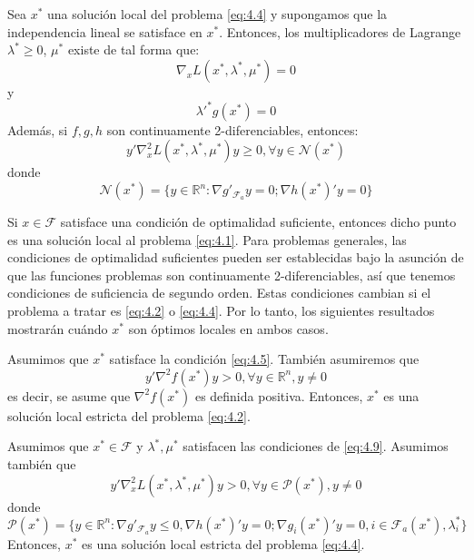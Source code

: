 \begin{proposicion}
Sea $x^*$ una solución local del problema \ref{eq:4.4} y supongamos que la independencia lineal se satisface en $x^*$. 
Entonces, los multiplicadores de Lagrange $\lambda^*\geq 0$, $\mu^*$ existe de tal forma que:
\begin{equation}
\nabla_xL(x^*,\lambda^*,\mu^*) = 0
\label{eq:4.9}
\end{equation}
y
\begin{equation*}
\lambda'^*g(x^*) = 0
\end{equation*}
Además, si $f,g,h$ son continuamente 2-diferenciables, entonces:
\begin{equation*}
y'\nabla_x^2L(x^*,\lambda^*,\mu^*)y \geq 0, \forall y\in\mathcal{N}(x^*)
\end{equation*}
donde
\begin{equation*}
\mathcal{N}(x^*) = \{y\in\mathbb{R}^n : \nabla g'_{\mathcal{F}_a}y=0; \nabla h(x^*)'y = 0\}
\end{equation*}
\end{proposicion}

Si $x\in\mathcal{F}$ satisface una condición de optimalidad suficiente, entonces dicho punto es una solución local al problema \ref{eq:4.1}. 
Para problemas generales, las condiciones de optimalidad suficientes pueden ser establecidas bajo la asunción de que las funciones problemas son continuamente 2-diferenciables, así que tenemos condiciones de suficiencia de segundo orden. 
Estas condiciones cambian si el problema a tratar es \ref{eq:4.2} o \ref{eq:4.4}. 
Por lo tanto, los siguientes resultados mostrarán cuándo $x^*$ son óptimos locales en ambos casos.

\begin{proposicion}
Asumimos que $x^*$ satisface la condición \ref{eq:4.5}. 
También asumiremos que 
\begin{equation*}
y'\nabla^2f(x^*)y > 0, \forall y\in\mathbb{R}^n, y \neq 0
\end{equation*}
es decir, se asume que $\nabla^2f(x^*)$ es definida positiva. 
Entonces, $x^*$ es una solución local estricta del problema \ref{eq:4.2}.
\end{proposicion}

\begin{proposicion}
Asumimos que $x^*\in\mathcal{F}$ y $\lambda^*,\mu^*$ satisfacen las condiciones de \ref{eq:4.9}. 
Asumimos también que 
\begin{equation}
y'\nabla^2_xL(x^*,\lambda^*,\mu^*)y > 0, \forall y\in\mathcal{P}(x^*), y\neq 0
\label{eq:4.10}
\end{equation}
donde
\begin{equation*}
\mathcal{P}(x^*) = \{y\in\mathbb{R}^n : \nabla g'_{\mathcal{F}_a} y\leq 0, \nabla h(x^*)'y = 0; \nabla g_i(x^*)'y = 0, i \in\mathcal{F}_a(x^*), \lambda_i^* \} 
\end{equation*}
Entonces, $x^*$ es una solución local estricta del problema \ref{eq:4.4}.
\end{proposicion}


